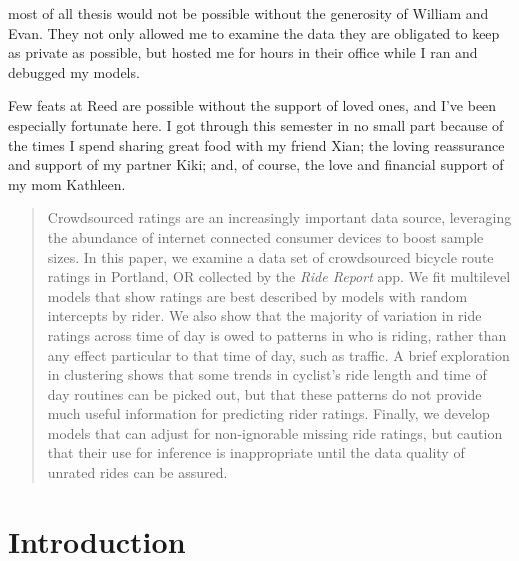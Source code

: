 \documentclass[12pt,twoside]{reedthesis}
\begin{document}
\begin{preface}
      most of all thesis would not be possible without the generosity of
      William and Evan. They not only allowed me to examine the data they are
      obligated to keep as private as possible, but hosted me for hours in
      their office while I ran and debugged my models. \par Few feats at Reed
      are possible without the support of loved ones, and I've been especially
      fortunate here. I got through this semester in no small part because of
      the times I spend sharing great food with my friend Xian; the loving
      reassurance and support of my partner Kiki; and, of course, the love and
      financial support of my mom Kathleen.
    \end{preface}
  

      \hypersetup{linkcolor=black}
    \setcounter{tocdepth}{1}
    \tableofcontents
  
      \listoftables
  
      \listoffigures
  
      \begin{abstract}
      Crowdsourced ratings are an increasingly important data source,
      leveraging the abundance of internet connected consumer devices to boost
      sample sizes. In this paper, we examine a data set of crowdsourced
      bicycle route ratings in Portland, OR collected by the
      \textit{Ride Report} app. We fit multilevel models that show ratings are
      best described by models with random intercepts by rider. We also show
      that the majority of variation in ride ratings across time of day is
      owed to patterns in who is riding, rather than any effect particular to
      that time of day, such as traffic. A brief exploration in clustering
      shows that some trends in cyclist's ride length and time of day routines
      can be picked out, but that these patterns do not provide much useful
      information for predicting rider ratings. Finally, we develop models
      that can adjust for non-ignorable missing ride ratings, but caution that
      their use for inference is inappropriate until the data quality of
      unrated rides can be assured.
    \end{abstract}
  
  
  \mainmatter %
  \pagestyle{fancyplain} %

  \chapter*{Introduction}\label{introduction}
  
\end{document}
